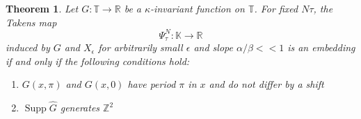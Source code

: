 \documentclass[11pt]{article}
\newtheorem{theorem}{Theorem}[section]
\theoremstyle{definition}
\theoremstyle{remark}
\newcommand{\RR}{\mathbb{R}}
\newcommand{\ZZ}{\mathbb{Z}}
\newcommand{\KK}{\mathbb{K}}
\newcommand{\TT}{\mathbb{T}}
\DeclareMathOperator{\Supp}{Supp}
\begin{document}

    \begin{theorem}
    \label{thm:klein}
    Let $G:\TT \rightarrow \RR$ be a $\kappa$-invariant function on $\TT$. For fixed $N\tau$, the Takens map
    \[\Psi_\tau^N: \KK \rightarrow \RR\]
    induced by $G$ and $X_\epsilon$ for arbitrarily small $\epsilon$ and slope $\alpha/\beta<<1$ is an embedding if and only if the following conditions hold:
    \begin{enumerate}
        \item $G(x,\pi)$ and $G(x,0)$ have period $\pi$ in $x$ and do not differ by a shift
        \item $\Supp \hat{G}$ generates $\ZZ^2$
    \end{enumerate}
    \end{theorem}
\end{document}
